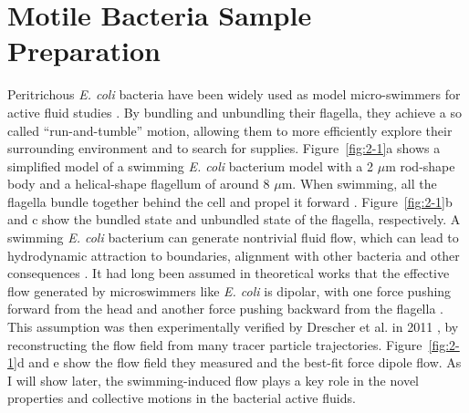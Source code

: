 \section{Motile Bacteria Sample Preparation}
\label{motile-bacteria-sample-preparation}
Peritrichous \textit{E. coli} bacteria have been widely used as model micro-swimmers for active fluid studies \cite{Poon2012, Schwarz-Linek2016}. By bundling and unbundling their flagella, they achieve a so called ``run-and-tumble'' motion, allowing them to more efficiently explore their surrounding environment and to search for supplies. Figure~\ref{fig:2-1}a shows a simplified model of a swimming \textit{E. coli} bacterium model with a 2 $\mu$m rod-shape body and a helical-shape flagellum of around 8 $\mu$m. When swimming, all the flagella bundle together behind the cell and propel it forward \cite{Lauga2016}. Figure~\ref{fig:2-1}b and c show the bundled state and unbundled state of the flagella, respectively. A swimming \textit{E. coli} bacterium can generate nontrivial fluid flow, which can lead to hydrodynamic attraction to boundaries, alignment with other bacteria and other consequences \cite{Elgeti2015}. It had long been assumed in theoretical works that the effective flow generated by microswimmers like \textit{E. coli} is dipolar, with one force pushing forward from the head and another force pushing backward from the flagella \cite{Simha2002, Ishikawa2007, Saintillan2008a, Saintillan2008b}. This assumption was then experimentally verified by Drescher et al. in 2011 \cite{Drescher2011}, by reconstructing the flow field from many tracer particle trajectories. Figure~\ref{fig:2-1}d and e show the flow field they measured and the best-fit force dipole flow. As I will show later, the swimming-induced flow plays a key role in the novel properties and collective motions in the bacterial active fluids.

